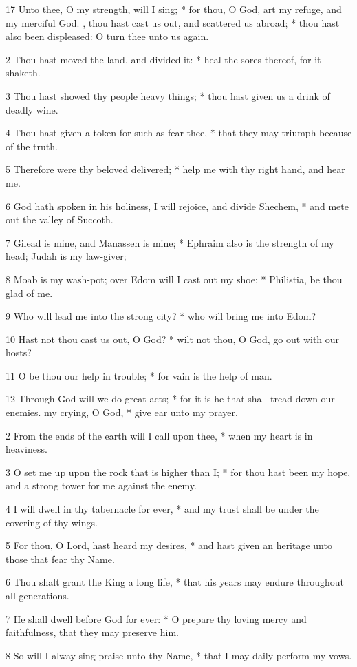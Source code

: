 17 Unto thee, O my strength, will I sing; * for thou, O God, art my refuge, and my merciful God.
, thou hast cast us out, and scattered us abroad; * thou hast also been displeased: O turn thee unto us again.\par
2 Thou hast moved the land, and divided it: * heal the sores thereof, for it shaketh.\par
3 Thou hast showed thy people heavy things; * thou hast given us a drink of deadly wine.\par
4 Thou hast given a token for such as fear thee, * that they may triumph because of the truth.\par
5 Therefore were thy beloved delivered; * help me with thy right hand, and hear me.\par
6 God hath spoken in his holiness, I will rejoice, and divide Shechem, * and mete out the valley of Succoth.\par
7 Gilead is mine, and Manasseh is mine; * Ephraim also is the strength of my head; Judah is my law-giver;\par
8 Moab is my wash-pot; over Edom will I cast out my shoe; * Philistia, be thou glad of me.\par
9 Who will lead me into the strong city? * who will bring me into Edom?\par
10 Hast not thou cast us out, O God? * wilt not thou, O God, go out with our hosts?\par
11 O be thou our help in trouble; * for vain is the help of man.\par
12 Through God will we do great acts; * for it is he that shall tread down our enemies.
 my crying, O God, * give ear unto my prayer.\par
2 From the ends of the earth will I call upon thee, * when my heart is in heaviness.\par
3 O set me up upon the rock that is higher than I; * for thou hast been my hope, and a strong tower for me against the enemy.\par
4 I will dwell in thy tabernacle for ever, * and my trust shall be under the covering of thy wings.\par
5 For thou, O Lord, hast heard my desires, * and hast given an heritage unto those that fear thy Name.\par
6 Thou shalt grant the King a long life, * that his years may endure throughout all generations.\par
7 He shall dwell before God for ever: * O prepare thy loving mercy and faithfulness, that they may preserve him.\par
8 So will I alway sing praise unto thy Name, * that I may daily perform my vows.
